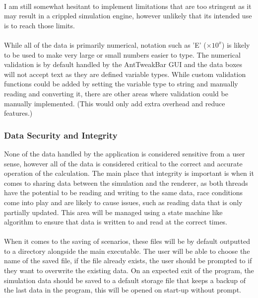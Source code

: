 \paragraph{}
I am still somewhat hesitant to implement limitations that are too stringent as it may result in a crippled simulation engine, however unlikely that its intended use is to reach those limits.

\paragraph{}
While all of the data is primarily numerical, notation such as 'E' ($\times10^x$) is likely to be used to make very large or small numbers easier to type. The numerical validation is by default handled by the AntTweakBar GUI and the data boxes will not accept text as they are defined variable types. While custom validation functions could be added by setting the variable type to string and manually reading and converting it, there are other areas where validation could be manually implemented. (This would only add extra overhead and reduce features.)

\subsubsection{Data Security and Integrity}
None of the data handled by the application is considered sensitive from a user sense, however all of the data is considered critical to the correct and accurate operation of the calculation. The main place that integrity is important is when it comes to sharing data between the simulation and the renderer, as both threads have the potential to be reading and writing to the same data, race conditions come into play and are likely to cause issues, such as reading data that is only partially updated. This area will be managed using a state machine like algorithm to ensure that data is written to and read at the correct times.

\paragraph{}
When it comes to the saving of scenarios, these files will be by default outputted to a directory alongside the main executable. The user will be able to choose the name of the saved file, if the file already exists, the user should be prompted to if they want to overwrite the existing data. On an expected exit of the program, the simulation data should be saved to a default storage file that keeps a backup of the last data in the program, this will be opened on start-up without prompt.

